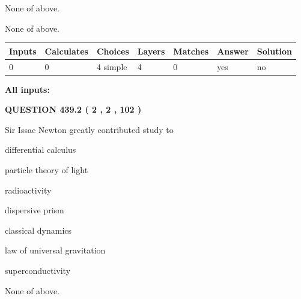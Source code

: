 \documentclass[12pt]{article}
\begin{document}
 
 None of above.
 
 
\noindent{}
 
 
 None of above.
 
 
\noindent{}
 
 
   
   
   
   
\noindent\begin{tabular}{|l|l|l|l|l|l|l|}
 \hline
Inputs & Calculates & Choices & Layers & Matches & Answer & Solution \\ \hline
 0  & 
 0  & 
 4
  simple  
  & 
 4  & 
 0  & 
  yes & 
  no 
  \\ \hline
 \end{tabular}
   
   
   
   
\noindent{}
   
   
   
   
\noindent\vspace{0.1in}\hspace{-0.08in} {\textbf{\Large{All inputs: }}}
   
   
  
\vspace{0.2in}
  
{\textbf{\Large{QUESTION
439.2 
 ( 2 , 2 , 102 )
}}}
  
  
Sir Issac Newton greatly contributed study to
 
 
differential calculus
 
 
particle theory of light
 
 
radioactivity
 
 
dispersive prism
 
 
classical dynamics
 
 
law of universal gravitation
 
 
superconductivity
 
 
 None of above.
 
 
\noindent{}
 
\end{document}
